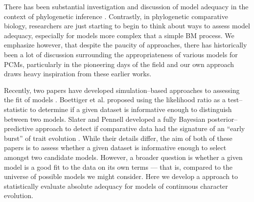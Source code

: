 \documentclass[a4paper,12pt]{article}
\begin{document}
There has been substantial investigation and discussion of model adequacy in the context of phylogenetic inference \citep{SullivanSwofford, Goldman, SandersonKim, Bollback2002, Ripplinger2010, Lewis2013, Reid2013}. Contrastly, in phylogenetic comparative biology, researchers are just starting to begin to think about ways to assess model adequacy, especially for models more complex that a simple BM process. We emphasize however, that despite the paucity of approaches, there has historically been a lot of discussion surrounding the appropriateness of various models for PCMs, particularly in the pioneering days of the field \citep{Felsenstein1985, Felsenstein1988, HarveyPagel1991, Garland1992, Pagel1993, Diaz1996, Price1997, Garland1999, GarlandIves2000, HansenOrzack2005, Hansen2012} and our own approach draws heavy inspiration from these earlier works.

Recently, two papers have developed simulation--based approaches to assessing the fit of models \citep{Boettiger2012, SlaterPennell}. Boettiger et al. \citep{Boettiger2012} proposed using the likelihood ratio as a test--statistic to determine if a given dataset is informative enough to distinguish between two models. Slater and Pennell \citep{SlaterPennell} developed a fully Bayesian posterior--predictive approach to detect if comparative data had the signature of an ``early burst'' of trait evolution \citep{FreckletonHarvey2006}. While their details differ, the aim of both of these papers is to assess whether a given dataset is informative enough to select amongst two candidate models. However, a broader question is whether a given model is a good fit to the data on its own terms --- that is, compared to the universe of possible models we might consider. Here we develop a approach to statistically evaluate absolute adequacy for models of continuous character evolution.
\end{document}
